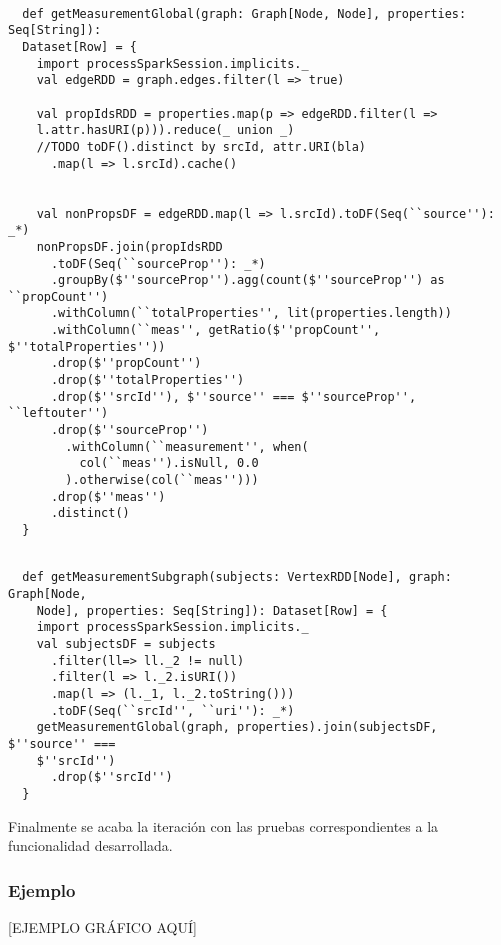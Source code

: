 \lstset{escapechar=@,language=scala}
\begin{lstlisting}[caption={Cálculo de la métrica en el grafo},captionpos=b, label=graphmetricSCglobal]

  def getMeasurementGlobal(graph: Graph[Node, Node], properties: Seq[String]):
  Dataset[Row] = {
    import processSparkSession.implicits._
    val edgeRDD = graph.edges.filter(l => true)

    val propIdsRDD = properties.map(p => edgeRDD.filter(l =>
    l.attr.hasURI(p))).reduce(_ union _)
    //TODO toDF().distinct by srcId, attr.URI(bla)
      .map(l => l.srcId).cache()


    val nonPropsDF = edgeRDD.map(l => l.srcId).toDF(Seq(``source''): _*)
    nonPropsDF.join(propIdsRDD
      .toDF(Seq(``sourceProp''): _*)
      .groupBy($''sourceProp'').agg(count($''sourceProp'') as ``propCount'')
      .withColumn(``totalProperties'', lit(properties.length))
      .withColumn(``meas'', getRatio($''propCount'', $''totalProperties''))
      .drop($''propCount'')
      .drop($''totalProperties'')
      .drop($''srcId''), $''source'' === $''sourceProp'', ``leftouter'')
      .drop($''sourceProp'')
        .withColumn(``measurement'', when(
          col(``meas'').isNull, 0.0
        ).otherwise(col(``meas'')))
      .drop($''meas'')
      .distinct()
  }

\end{lstlisting}
\lstset{escapechar=@,language=scala}
\begin{lstlisting}[caption={Cálculo de la métrica en colección de nodos},captionpos=b, label=graphmetricSC]

  def getMeasurementSubgraph(subjects: VertexRDD[Node], graph: Graph[Node,
    Node], properties: Seq[String]): Dataset[Row] = {
    import processSparkSession.implicits._
    val subjectsDF = subjects
      .filter(ll=> ll._2 != null)
      .filter(l => l._2.isURI())
      .map(l => (l._1, l._2.toString()))
      .toDF(Seq(``srcId'', ``uri''): _*)
    getMeasurementGlobal(graph, properties).join(subjectsDF, $''source'' ===
    $''srcId'')
      .drop($''srcId'')
  }

\end{lstlisting}

Finalmente se acaba la iteración con las pruebas correspondientes a la
funcionalidad desarrollada. 

\subsubsection{Ejemplo}
[EJEMPLO GRÁFICO AQUÍ]

